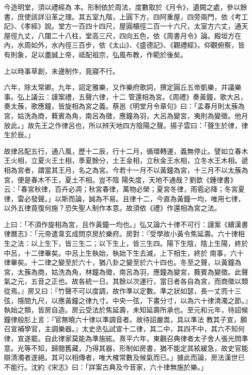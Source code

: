 \begin{pinyinscope}
 今造明堂，須以禮經為
 本。形制依於周法，度數取於《月令》，遺闕之處，參以餘書，庶使該詳沿革之理。其五室九階，上圓下方，四阿重屋，四旁兩門，依《考工記》、《孝經》說。堂方一百四十四尺，屋圓楣徑二百一十六尺，太室方六丈，通天屋徑九丈，八闥二十八柱，堂高三尺，四向五色，依《周書月令》論。殿垣方在內，水周如外，水內徑三百步，依《太山》、《盛德記》、《觀禮經》。仰觀俯察，皆有則象，足以盡誠上帝，祗配祖宗，弘風布教，作範於後矣。



 上以時事草創，未邊制作，竟寢不行。



 六年，除太常卿。九年，詔定雅樂，又作樂府歌詞，撰定圓丘五帝凱樂，并議樂事。弘上議云：謹案禮，五聲六律，十二
 管還相為宮。《周禮》奏黃鐘，歌大呂，奏太蔟，歌應鐘，皆旋相為宮之義。蔡邕《明堂月令章句》曰：「孟春月則太蔟為宮，姑洗為商，蕤賓為角，南呂為徵，應鐘為羽，大呂為變宮，夷則為變徵。他月放此。」故先王之作律呂也，所以辨天地四方陰陽之聲。揚子雲曰：「聲生於律，律生於辰。」



 故律呂配五行，通八風，歷十二辰，行十二月，循環轉運，義無停止。譬如立春木王火相，立夏火王土相，季夏餘分，土王金相，立秋金王水相，立冬水王木相。遞相為宮者，謂當其王月，名之為宮。今若十一月不以黃鐘為宮，十三月不以太蔟為宮，便是春木不王，夏土不相。豈不陰
 陽失度，天地不通哉？劉歆《鍾律書》云：「春宮秋律，百卉必凋；秋宮春律，萬物必榮；夏宮冬律，雨雹必降；冬宮夏律，雷必發聲。」以斯而論，誠為不易。且律十二，今直為黃鐘一均，唯用七律，以外五律竟復何施？恐失聖人制作本意。故須依《禮》作還相為宮之法。



 上曰：「不須作旋相為宮，且作黃鐘一均也。」弘又論六十律不可行：謹案《續漢書律曆志》：「元帝遣韋玄成問京房於樂府。房對：『受學故小黃令焦延壽。六十律相生之法：以上生下，皆三生二；以下生上，皆三生四。陽下生陰，陰上生陽，終於中呂，十二律畢矣。中呂上生執始，執始下生去滅，上下相生，終於
 南事，六十律畢矣。十二律之變至於六十，猶八卦之變至於六十四也。冬至之聲，以黃鐘為宮，太蔟為商，姑洗為角，林鐘為徵，南呂為羽，應鐘為變宮，蕤賓為變徵。此聲氣之元，五音之正也。故各統一日。其餘以次運行，當日者各自為宮，而商徵以類從焉。』房又曰：『竹聲不可以度調，故作準以定數。準之狀如瑟，長一丈而十三弦，隱間九尺，以應黃鐘之律九寸。中央一弦，下畫分寸，以為六十律清濁之節。』執始之類，皆房自造。房云受法於焦延壽，未知延壽所承也。至元和元年，待詔候鐘律般肜上言：『官無曉六十律以準調音者。故待詔嚴嵩，具以準法
 教其子宣，願召宣補學官，主調樂器。』太史丞弘試宣十二律，其二中，其四不中，其六不知何律，宣遂罷。自此律家莫能為準施絃。熹平六年，東觀召典律者太子舍人張光問準意。光等不知，歸閱舊藏，乃得其器，形制如房書，猶不能定其絃緩急，故史官能辯清濁者遂絕。其可以相傳者，唯大榷常數及候氣而已。」據此而論，房法漢世已不能行。沈約《宋志》曰：「詳案古典及今音家，六十律無施於樂。」




\end{pinyinscope}
